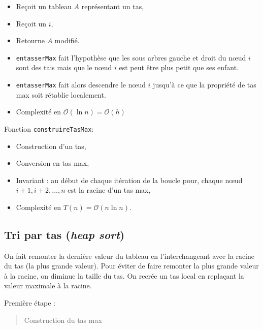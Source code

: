 \begin{itemize}
\item
  Reçoit un tableau \(A\) représentant un tas,\vspace{-2mm}
\item
  Reçoit un \(i\),\vspace{-2mm}
\item
  Retourne \(A\) modifié.\vspace{3mm}
\item
  \texttt{entasserMax} fait l'hypothèse que les sous arbres gauche et
  droit du nœud \(i\) sont des tais mais que le nœud \(i\) est peut être
  plus petit que ses enfant.\vspace{3mm}
\item
  \texttt{entasserMax} fait alors descendre le nœud \(i\) jusqu'à ce que
  la propriété de tas max soit rétablie localement.\vspace{3mm}
\item
  Complexité en \(\mathcal{O}(\ln n) = \mathcal{O}(h)\)
\end{itemize}

Fonction \texttt{construireTasMax}:

\begin{itemize}
\tightlist
\item
  Construction d'un tas,
\item
  Conversion en tas max,
\item
  Invariant : au début de chaque itération de la boucle pour, chaque
  nœud \(i+1, i+2, \ldots, n\) est la racine d'un tas max,
\item
  Complexité en \(T(n) = \mathcal{O}(n\ln n)\).
\end{itemize}

\hypertarget{tri-par-tas-heap-sort}{%
\subsection{\texorpdfstring{Tri par tas (\emph{heap
sort})}{Tri par tas (heap sort)}}\label{tri-par-tas-heap-sort}}

On fait remonter la dernière valeur du tableau en l'interchangeant avec
la racine du tas (la plus grande valeur). Pour éviter de faire remonter
la plus grande valeur à la racine, on diminue la taille du tas. On
recrée un tas local en replaçant la valeur maximale à la racine.

Première étape : \vspace{-2mm}

\begin{quote}
Construction du tas max \vspace{-2mm}
\end{quote}

